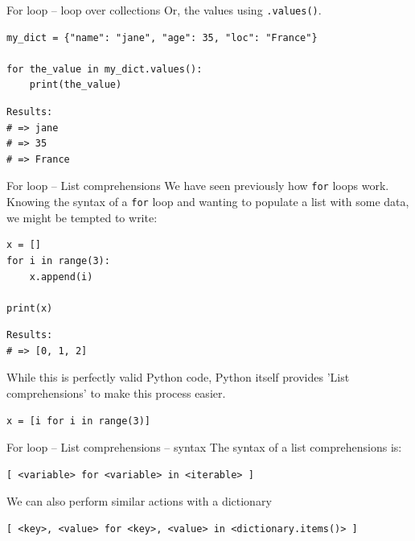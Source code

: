 \documentclass[10pt]{beamer}
\begin{document}
\begin{frame}[label={sec:org4216673},fragile]{For loop -- loop over collections}
 Or, the values using \texttt{.values()}.

\begin{verbatim}
my_dict = {"name": "jane", "age": 35, "loc": "France"}

for the_value in my_dict.values():
    print(the_value)
\end{verbatim}

\begin{verbatim}
Results: 
# => jane
# => 35
# => France
\end{verbatim}
\end{frame}

\begin{frame}[label={sec:org63025a6},fragile]{For loop -- List comprehensions}
 We have seen previously how \texttt{for} loops work. Knowing the syntax of a \texttt{for} loop and
wanting to populate a list with some data, we might be tempted to write:

\begin{verbatim}
x = []
for i in range(3):
    x.append(i)

print(x)
\end{verbatim}

\begin{verbatim}
Results: 
# => [0, 1, 2]
\end{verbatim}


While this is perfectly valid Python code, Python itself provides 'List
comprehensions' to make this process easier.

\begin{verbatim}
x = [i for i in range(3)]
\end{verbatim}
\end{frame}

\begin{frame}[label={sec:orgf259758},fragile]{For loop -- List comprehensions -- syntax}
 The syntax of a list comprehensions is:

\begin{verbatim}
[ <variable> for <variable> in <iterable> ]
\end{verbatim}

We can also perform similar actions with a dictionary

\begin{verbatim}
[ <key>, <value> for <key>, <value> in <dictionary.items()> ]
\end{verbatim}
\end{frame}
\end{document}
